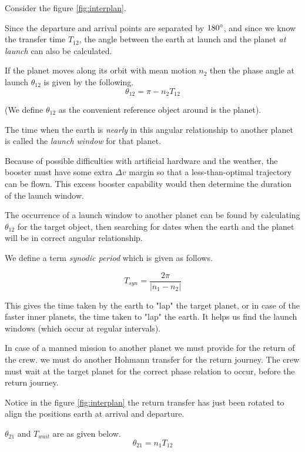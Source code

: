 \documentclass{article}
\theoremstyle{definition}
\begin{document}
Consider the figure \ref{fig:interplan}.

Since the departure and arrival points are separated by $180\degree$, and since we know the transfer time $T_{12}$, the angle between the earth at launch and the planet \emph{at launch} can also be calculated.

If the planet moves along its orbit with mean motion $n_2$ then the phase angle at launch $\theta_{12}$ is given by the following.
\begin{equation}
 \theta_{12} = \pi - n_2 T_{12}
\end{equation}

(We define $\theta_{12}$ as the convenient reference object around is the planet).

The time when the earth is \emph{nearly} in this angular relationship to another planet is called the \emph{launch window} for that planet. 

Because of possible difficulties with artificial hardware and the weather, the booster must have some extra $\Delta v$ margin so that a less-than-optimal trajectory can be flown.
This excess booster capability would then determine the duration of the launch window.

The occurrence of a launch window to another planet can be found by calculating $\theta_{12}$ for the target object, then searching for dates when the earth and the planet will be in correct angular relationship. 

We define a term \emph{synodic period} which is given as follows.

\begin{equation}
    T_{syn} = \frac{2\pi}{|n_1 - n_2|}
\end{equation}

This gives the time taken by the earth to "lap" the target planet, or in case of the faster inner planets, the time taken to "lap" the earth.
It helps us find the launch windows (which occur at regular intervals).

In case of a manned mission to another planet we must provide for the return of the crew. 
we must do another Hohmann transfer for the return journey. 
The crew must wait at the target planet for the correct phase relation to occur, before the return journey.

Notice in the figure \ref{fig:interplan} the return transfer has just been rotated to align the positions earth at arrival and departure.

$\theta_{21}$ and $T_{wait}$ are as given below.
\begin{equation}
    \theta_{21} = n_1 T_{12}
\end{equation}
\end{document}
